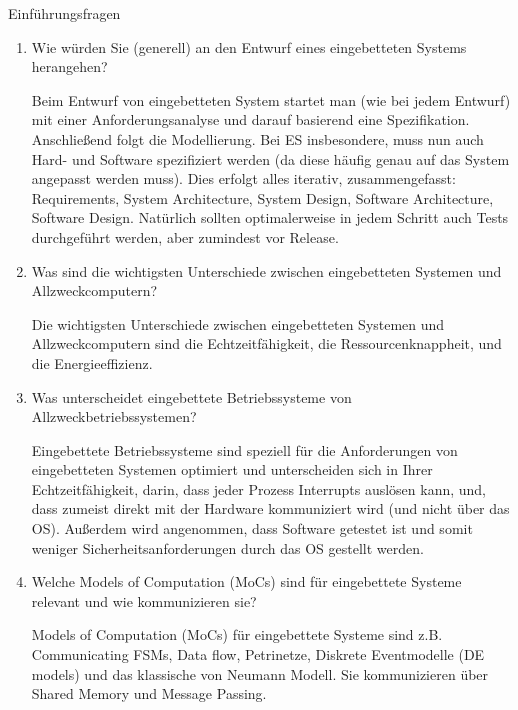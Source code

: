 \documentclass{article}
\author{Leopold Lemmermann}
\begin{document}
\createtitle

\begin{exercise}{Einführungsfragen}
  \begin{enumerate}
    \item Wie würden Sie (generell) an den Entwurf eines eingebetteten Systems herangehen?

          \begin{solution}
            Beim Entwurf von eingebetteten System startet man (wie bei jedem Entwurf) mit einer Anforderungsanalyse und darauf basierend eine Spezifikation. Anschließend folgt die Modellierung. Bei ES insbesondere, muss nun auch Hard- und Software spezifiziert werden (da diese häufig genau auf das System angepasst werden muss). Dies erfolgt alles iterativ, zusammengefasst: Requirements, System Architecture, System Design, Software Architecture, Software Design. Natürlich sollten optimalerweise in jedem Schritt auch Tests durchgeführt werden, aber zumindest vor Release.
          \end{solution}

    \item Was sind die wichtigsten Unterschiede zwischen eingebetteten Systemen und Allzweckcomputern?

          \begin{solution}
            Die wichtigsten Unterschiede zwischen eingebetteten Systemen und Allzweckcomputern sind die Echtzeitfähigkeit, die Ressourcenknappheit, und die Energieeffizienz.
          \end{solution}

    \item Was unterscheidet eingebettete Betriebssysteme von Allzweckbetriebssystemen?

          \begin{solution}
            Eingebettete Betriebssysteme sind speziell für die Anforderungen von eingebetteten Systemen optimiert und unterscheiden sich in Ihrer Echtzeitfähigkeit, darin, dass jeder Prozess Interrupts auslösen kann, und, dass zumeist direkt mit der Hardware kommuniziert wird (und nicht über das OS). Außerdem wird angenommen, dass Software getestet ist und somit weniger Sicherheitsanforderungen durch das OS gestellt werden.
          \end{solution}

    \item Welche Models of Computation (MoCs) sind für eingebettete Systeme relevant und wie kommunizieren sie?

          \begin{solution}
            Models of Computation (MoCs) für eingebettete Systeme sind z.B. Communicating FSMs, Data flow, Petrinetze, Diskrete Eventmodelle (DE models) und das klassische von Neumann Modell. Sie kommunizieren über Shared Memory und Message Passing.
          \end{solution}
  \end{enumerate}
\end{exercise}
\end{document}
